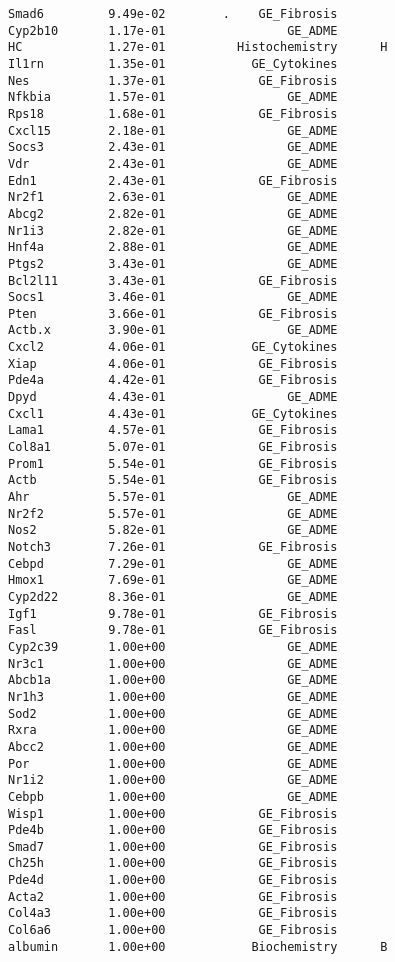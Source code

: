 \documentclass[]{article}
\begin{document}
\begin{verbatim}
Smad6         9.49e-02        .    GE_Fibrosis       
Cyp2b10       1.17e-01                 GE_ADME       
HC            1.27e-01          Histochemistry      H
Il1rn         1.35e-01            GE_Cytokines       
Nes           1.37e-01             GE_Fibrosis       
Nfkbia        1.57e-01                 GE_ADME       
Rps18         1.68e-01             GE_Fibrosis       
Cxcl15        2.18e-01                 GE_ADME       
Socs3         2.43e-01                 GE_ADME       
Vdr           2.43e-01                 GE_ADME       
Edn1          2.43e-01             GE_Fibrosis       
Nr2f1         2.63e-01                 GE_ADME       
Abcg2         2.82e-01                 GE_ADME       
Nr1i3         2.82e-01                 GE_ADME       
Hnf4a         2.88e-01                 GE_ADME       
Ptgs2         3.43e-01                 GE_ADME       
Bcl2l11       3.43e-01             GE_Fibrosis       
Socs1         3.46e-01                 GE_ADME       
Pten          3.66e-01             GE_Fibrosis       
Actb.x        3.90e-01                 GE_ADME       
Cxcl2         4.06e-01            GE_Cytokines       
Xiap          4.06e-01             GE_Fibrosis       
Pde4a         4.42e-01             GE_Fibrosis       
Dpyd          4.43e-01                 GE_ADME       
Cxcl1         4.43e-01            GE_Cytokines       
Lama1         4.57e-01             GE_Fibrosis       
Col8a1        5.07e-01             GE_Fibrosis       
Prom1         5.54e-01             GE_Fibrosis       
Actb          5.54e-01             GE_Fibrosis       
Ahr           5.57e-01                 GE_ADME       
Nr2f2         5.57e-01                 GE_ADME       
Nos2          5.82e-01                 GE_ADME       
Notch3        7.26e-01             GE_Fibrosis       
Cebpd         7.29e-01                 GE_ADME       
Hmox1         7.69e-01                 GE_ADME       
Cyp2d22       8.36e-01                 GE_ADME       
Igf1          9.78e-01             GE_Fibrosis       
Fasl          9.78e-01             GE_Fibrosis       
Cyp2c39       1.00e+00                 GE_ADME       
Nr3c1         1.00e+00                 GE_ADME       
Abcb1a        1.00e+00                 GE_ADME       
Nr1h3         1.00e+00                 GE_ADME       
Sod2          1.00e+00                 GE_ADME       
Rxra          1.00e+00                 GE_ADME       
Abcc2         1.00e+00                 GE_ADME       
Por           1.00e+00                 GE_ADME       
Nr1i2         1.00e+00                 GE_ADME       
Cebpb         1.00e+00                 GE_ADME       
Wisp1         1.00e+00             GE_Fibrosis       
Pde4b         1.00e+00             GE_Fibrosis       
Smad7         1.00e+00             GE_Fibrosis       
Ch25h         1.00e+00             GE_Fibrosis       
Pde4d         1.00e+00             GE_Fibrosis       
Acta2         1.00e+00             GE_Fibrosis       
Col4a3        1.00e+00             GE_Fibrosis       
Col6a6        1.00e+00             GE_Fibrosis       
albumin       1.00e+00            Biochemistry      B
\end{verbatim}
\end{document}
